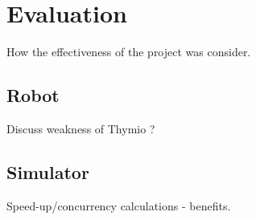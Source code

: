 \section{Evaluation}
How the effectiveness of the project was consider. 

\subsection{Robot}
Discuss weakness of Thymio ?

\subsection{Simulator}
Speed-up/concurrency calculations - benefits.

